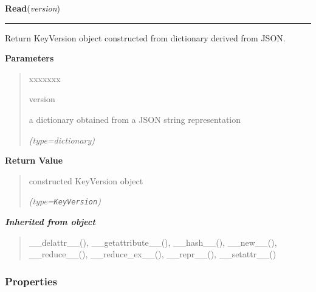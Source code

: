 \hspace{.8\funcindent}\begin{boxedminipage}{\funcwidth}

    \raggedright \textbf{Read}(\textit{version})

    \vspace{-1.5ex}

    \rule{\textwidth}{0.5\fboxrule}
\setlength{\parskip}{2ex}
    Return KeyVersion object constructed from dictionary derived from JSON.

\setlength{\parskip}{1ex}
      \textbf{Parameters}
      \vspace{-1ex}

      \begin{quote}
        \begin{Ventry}{xxxxxxx}

          \item[version]

          a dictionary obtained from a JSON string representation

            {\it (type=dictionary)}

        \end{Ventry}

      \end{quote}

      \textbf{Return Value}
    \vspace{-1ex}

      \begin{quote}
      constructed KeyVersion object

      {\it (type=\texttt{KeyVersion})}

      \end{quote}

    \end{boxedminipage}


\large{\textbf{\textit{Inherited from object}}}

\begin{quote}
\_\_delattr\_\_(), \_\_getattribute\_\_(), \_\_hash\_\_(), \_\_new\_\_(), \_\_reduce\_\_(), \_\_reduce\_ex\_\_(), \_\_repr\_\_(), \_\_setattr\_\_()
\end{quote}


  \subsubsection{Properties}

